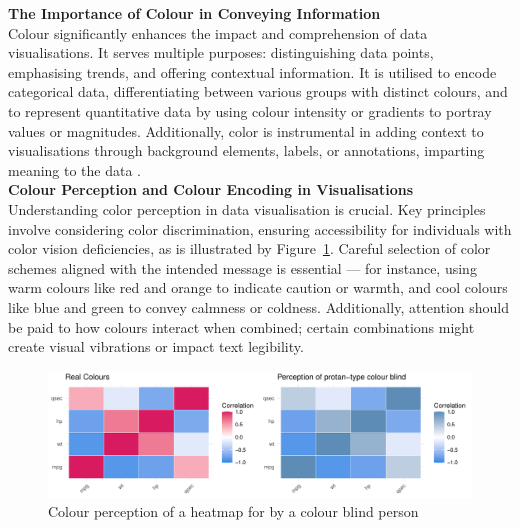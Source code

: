 \documentclass{article}\usepackage[]{graphicx}\usepackage[]{xcolor}
\makeatletter
\def\maxwidth{ %
  \ifdim\Gin@nat@width>\linewidth
    \linewidth
  \else
    \Gin@nat@width
  \fi
}
\newenvironment{knitrout}{}{} %
\makeatother
\begin{document}
\noindent \textbf{The Importance of Colour in Conveying Information}\\
Colour significantly enhances the impact and comprehension of data visualisations. It serves multiple purposes: distinguishing data points, emphasising trends, and offering contextual information. It is utilised to encode categorical data, differentiating between various groups with distinct colours, and to represent quantitative data by using colour intensity or gradients to portray values or magnitudes. Additionally, color is instrumental in adding context to visualisations through background elements, labels, or annotations, imparting meaning to the data \cite{healy2018data}.\\

\noindent \textbf{Colour Perception and Colour Encoding in Visualisations}\\
Understanding color perception in data visualisation is crucial. Key principles involve considering color discrimination, ensuring accessibility for individuals with color vision deficiencies, as is illustrated by Figure~\ref{fig:colour-plot}. Careful selection of color schemes aligned with the intended message is essential — for instance, using warm colours like red and orange to indicate caution or warmth, and cool colours like blue and green to convey calmness or coldness. Additionally, attention should be paid to how colours interact when combined; certain combinations might create visual vibrations or impact text legibility.\\

\begin{knitrout}\scriptsize
{}\color{fgcolor}\begin{figure}[H]

{\centering \includegraphics[width=\maxwidth]{figure/beamer-colour-plot-1} 

}

\caption[Colour perception of a heatmap for by a colour blind person]{Colour perception of a heatmap for by a colour blind person}\label{fig:colour-plot}
\end{figure}

\end{knitrout}
\end{document}
